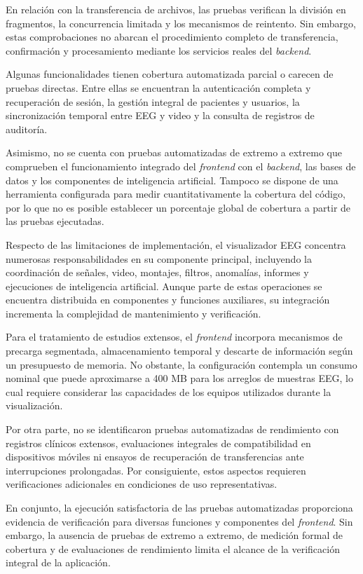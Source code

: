En relación con la transferencia
de archivos, las pruebas
verifican la división en
fragmentos, la concurrencia
limitada y los mecanismos
de reintento. Sin embargo,
estas comprobaciones no
abarcan el procedimiento
completo de transferencia,
confirmación y procesamiento
mediante los servicios reales
del \textit{backend}.

Algunas funcionalidades tienen
cobertura automatizada parcial
o carecen de pruebas directas.
Entre ellas se encuentran
la autenticación completa
y recuperación de sesión,
la gestión integral de
pacientes y usuarios,
la sincronización temporal
entre EEG y video y la
consulta de registros
de auditoría.

Asimismo, no se cuenta con
pruebas automatizadas de
extremo a extremo que
comprueben el funcionamiento
integrado del \textit{frontend} con
el \textit{backend}, las bases de
datos y los componentes de
inteligencia artificial.
Tampoco se dispone de una
herramienta configurada
para medir cuantitativamente
la cobertura del código,
por lo que no es posible
establecer un porcentaje
global de cobertura a
partir de las pruebas
ejecutadas.

Respecto de las limitaciones
de implementación, el
visualizador EEG concentra
numerosas responsabilidades
en su componente principal,
incluyendo la coordinación
de señales, video, montajes,
filtros, anomalías, informes
y ejecuciones de inteligencia
artificial. Aunque parte
de estas operaciones se
encuentra distribuida en
componentes y funciones
auxiliares, su integración
incrementa la complejidad
de mantenimiento y
verificación.

Para el tratamiento de
estudios extensos, el
\textit{frontend} incorpora mecanismos
de precarga segmentada,
almacenamiento temporal
y descarte de información
según un presupuesto de
memoria. No obstante, la
configuración contempla
un consumo nominal que
puede aproximarse a
400 MB para los arreglos
de muestras EEG, lo cual
requiere considerar las
capacidades de los equipos
utilizados durante la
visualización.

Por otra parte, no se
identificaron pruebas
automatizadas de rendimiento
con registros clínicos
extensos, evaluaciones
integrales de compatibilidad
en dispositivos móviles
ni ensayos de recuperación
de transferencias ante
interrupciones prolongadas.
Por consiguiente, estos
aspectos requieren
verificaciones adicionales
en condiciones de uso
representativas.


En conjunto, la ejecución satisfactoria de las pruebas
automatizadas proporciona evidencia de verificación
para diversas funciones y componentes del \textit{frontend}.
Sin embargo, la ausencia de pruebas de extremo a extremo,
de medición formal de cobertura y de evaluaciones de
rendimiento limita el alcance de la verificación integral
de la aplicación.


